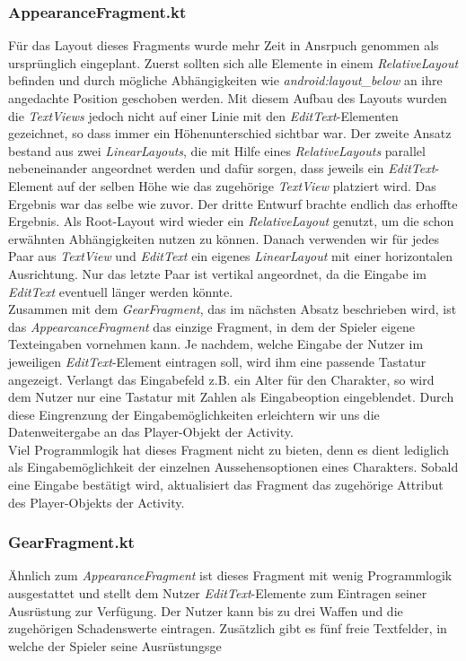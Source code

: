 \subsubsection{AppearanceFragment.kt}
Für das Layout dieses Fragments wurde mehr Zeit in Ansrpuch genommen als ursprünglich eingeplant. Zuerst sollten sich alle Elemente in einem \textit{RelativeLayout} befinden und durch mögliche Abhängigkeiten wie \textit{android:layout\_below} an ihre angedachte Position geschoben werden. Mit diesem Aufbau des Layouts wurden die \textit{TextViews} jedoch nicht auf einer Linie mit den \textit{EditText}-Elementen gezeichnet, so dass immer ein Höhenunterschied sichtbar war. Der zweite Ansatz bestand aus zwei \textit{LinearLayouts}, die mit Hilfe eines \textit{RelativeLayouts} parallel nebeneinander angeordnet werden und dafür sorgen, dass jeweils ein \textit{EditText}-Element auf der selben Höhe wie das zugehörige \textit{TextView} platziert wird. Das Ergebnis war das selbe wie zuvor. Der dritte Entwurf brachte endlich das erhoffte Ergebnis. Als Root-Layout wird wieder ein \textit{RelativeLayout} genutzt, um die schon erwähnten Abhängigkeiten nutzen zu können. Danach verwenden wir für jedes Paar aus \textit{TextView} und \textit{EditText} ein eigenes \textit{LinearLayout} mit einer horizontalen Ausrichtung. Nur das letzte Paar ist vertikal angeordnet, da die Eingabe im \textit{EditText} eventuell länger werden könnte.\\

Zusammen mit dem \textit{GearFragment}, das im nächsten Absatz beschrieben wird, ist das \textit{AppearcanceFragment} das einzige Fragment, in dem der Spieler eigene Texteingaben vornehmen kann. Je nachdem, welche Eingabe der Nutzer im jeweiligen \textit{EditText}-Element eintragen soll, wird ihm eine passende Tastatur angezeigt. Verlangt das Eingabefeld z.B. ein Alter für den Charakter, so wird dem Nutzer nur eine Tastatur mit Zahlen als Eingabeoption eingeblendet. Durch diese Eingrenzung der Eingabemöglichkeiten erleichtern wir uns die Datenweitergabe an das Player-Objekt der Activity.\\

Viel Programmlogik hat dieses Fragment nicht zu bieten, denn es dient lediglich als Eingabemöglichkeit der einzelnen Aussehensoptionen eines Charakters. Sobald eine Eingabe bestätigt wird, aktualisiert das Fragment das zugehörige Attribut des Player-Objekts der Activity.

\subsubsection{GearFragment.kt}
Ähnlich zum \textit{AppearanceFragment} ist dieses Fragment mit wenig Programmlogik ausgestattet und stellt dem Nutzer \textit{EditText}-Elemente zum Eintragen seiner Ausrüstung zur Verfügung. Der Nutzer kann bis zu drei Waffen und die zugehörigen Schadenswerte eintragen. Zusätzlich gibt es fünf freie Textfelder, in welche der Spieler seine Ausrüstungsge


